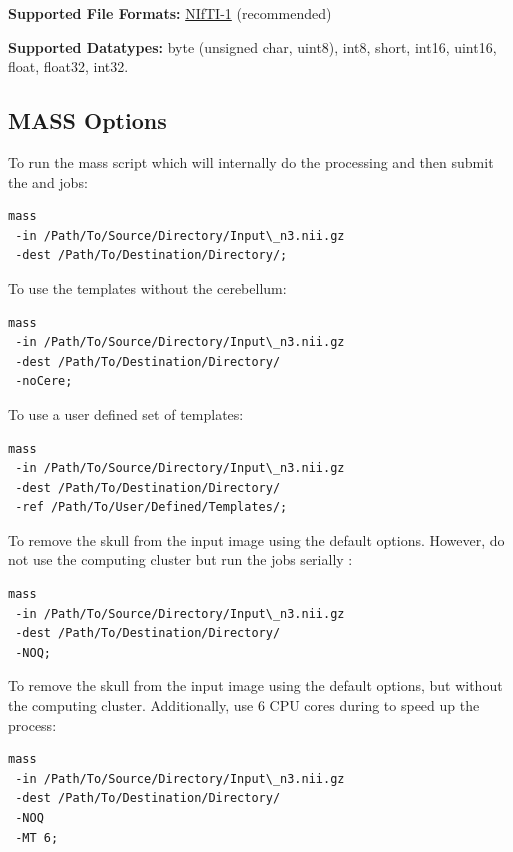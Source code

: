 \documentclass[letterpaper,10pt,english]{sphinxhowto}
\begin{document}
\textbf{Supported File Formats:} \href{http://nifti.nimh.nih.gov/nifti-1/}{NIfTI-1} (recommended)

\textbf{Supported Datatypes:} byte (unsigned char, uint8), int8, short, int16, uint16, float, float32, int32.


\subsection{MASS Options}
\label{manual:id2}\label{manual:mass-options}
To run the mass script which will internally do the processing and then submit the
 and  jobs:

\begin{Verbatim}[commandchars=\\\{\}]
mass
 -in /Path/To/Source/Directory/Input\_n3.nii.gz
 -dest /Path/To/Destination/Directory/;
\end{Verbatim}

To use the templates without the cerebellum:

\begin{Verbatim}[commandchars=\\\{\}]
mass
 -in /Path/To/Source/Directory/Input\_n3.nii.gz
 -dest /Path/To/Destination/Directory/
 -noCere;
\end{Verbatim}

To use a user defined set of templates:

\begin{Verbatim}[commandchars=\\\{\}]
mass
 -in /Path/To/Source/Directory/Input\_n3.nii.gz
 -dest /Path/To/Destination/Directory/
 -ref /Path/To/User/Defined/Templates/;
\end{Verbatim}

To remove the skull from the input image using the default options. However, do
not use the computing cluster but run the  jobs serially :

\begin{Verbatim}[commandchars=\\\{\}]
mass
 -in /Path/To/Source/Directory/Input\_n3.nii.gz
 -dest /Path/To/Destination/Directory/
 -NOQ;
\end{Verbatim}

To remove the skull from the input image using the default options, but without
the computing cluster. Additionally, use 6 CPU cores during 
to speed up the process:

\begin{Verbatim}[commandchars=\\\{\}]
mass
 -in /Path/To/Source/Directory/Input\_n3.nii.gz
 -dest /Path/To/Destination/Directory/
 -NOQ
 -MT 6;
\end{Verbatim}
\end{document}
